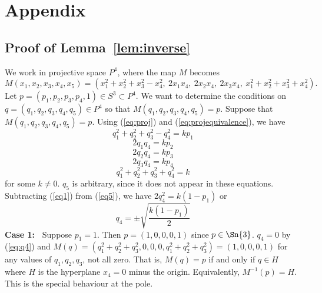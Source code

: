 \documentclass[11pt]{article}
\begin{document}
\clearpage

\section{Appendix}
\label{sec:appendix}

\subsection{Proof of Lemma~\ref{lem:inverse}}

\prf
We work in projective space $P^4$, where the map $M$ becomes
\begin{equation}
\label{eq:proj}
	 M(x_1,x_2,x_3,x_4,x_5) =
	 (x_1^2 + x_2^2 + x_3^2 - x_4^2,\ 
	 2x_1 x_4,\ 2x_2 x_4,\ 2x_3 x_4,\ 
	 x_1^2 + x_2^2 + x_3^2 + x_4^2).
\end{equation}
Let $p = (p_1,p_2,p_3,p_4,1) \in S^3 \subset P^4$.
We want to determine the conditions on $q = (q_1,q_2,q_3,q_4,q_5) \in P^4$
so that $M(q_1,q_2,q_3,q_4,q_5) = p$.
Suppose that $M(q_1,q_2,q_3,q_4,q_5) = p$.
Using (\ref{eq:proj}) and (\ref{eq:projequivalence}), we have
\begin{equation}
\label{eq1}
	q_1^2 + q_2^2 + q_3^2 - q_4^2 = kp_1
\end{equation}
\begin{equation}
\label{eq2}
	2q_1q_4	= kp_2
\end{equation}
\begin{equation}
\label{eq3}
	2q_2q_4	= kp_3
\end{equation}
\begin{equation}
\label{eq4}
	2q_3q_4	= kp_4
\end{equation}
\begin{equation}
\label{eq5}
	q_1^2 + q_2^2 + q_3^2 + q_4^2 = k
\end{equation}
for some $k \neq 0$.
$q_5$ is arbitrary, since it does not appear in these equations.
Subtracting (\ref{eq1}) from (\ref{eq5}), 
we have $2q_4^2 = k(1 - p_1)$
or 
\begin{equation}
\label{eq:q4}
q_4 = \pm \sqrt{\frac{k(1-p_1)}{2}}
\end{equation}
%
{\bf Case 1:\ }
Suppose $p_1 = 1$. Then $p = (1,0,0,0,1)$ since $p \in \Sn{3}$.
$q_4 = 0$ by (\ref{eq:q4})
and $M(q) = (q_1^2 + q_2^2 + q_3^2, 0, 0, 0, q_1^2 + q_2^2 + q_3^2)
       = (1,0,0,0,1)$ for any values of $q_1,q_2,q_3$, not all zero.
That is, $M(q) = p$ if and only if $q \in H$ where $H$ is 
the hyperplane $x_4 = 0$ minus the origin.
Equivalently, $M^{-1}(p) = H$.
This is the special behaviour at the pole.\\
\end{document}
